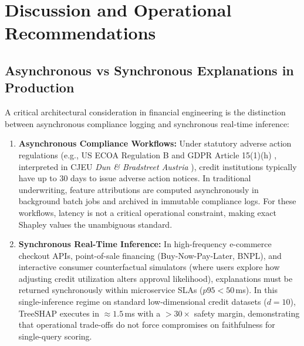 \documentclass[conference]{IEEEtran}
\begin{document}
\section{Discussion and Operational Recommendations}
\subsection{Asynchronous vs Synchronous Explanations in Production}
A critical architectural consideration in financial engineering is the distinction between asynchronous compliance logging and synchronous real-time inference:
\begin{enumerate}
    \item \textbf{Asynchronous Compliance Workflows:} Under statutory adverse action regulations (e.g., US ECOA Regulation B \cite{ecoa_reg_b} and GDPR Article 15(1)(h) \cite{gdpr_2016}, interpreted in CJEU \textit{Dun \& Bradstreet Austria} \cite{cjeu_dun_bradstreet_2025}), credit institutions typically have up to 30 days to issue adverse action notices. In traditional underwriting, feature attributions are computed asynchronously in background batch jobs and archived in immutable compliance logs. For these workflows, latency is not a critical operational constraint, making exact Shapley values the unambiguous standard.
    \item \textbf{Synchronous Real-Time Inference:} In high-frequency e-commerce checkout APIs, point-of-sale financing (Buy-Now-Pay-Later, BNPL), and interactive consumer counterfactual simulators (where users explore how adjusting credit utilization alters approval likelihood), explanations must be returned synchronously within microservice SLAs ($p95 < 50$\,ms). In this single-inference regime on standard low-dimensional credit datasets ($d=10$), TreeSHAP executes in $\approx 1.5$\,ms with a $>30\times$ safety margin, demonstrating that operational trade-offs do not force compromises on faithfulness for single-query scoring.
\end{enumerate}
\end{document}
